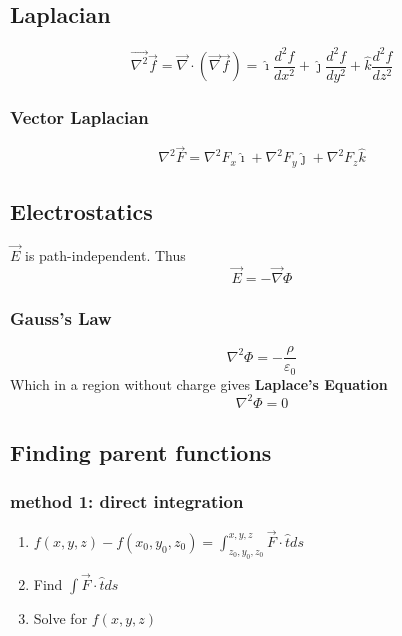 \subsection{Laplacian}
\begin{equation}
	\vec{\nabla^2}\vec{f}=\vec{\nabla}\cdot(\vec{\nabla}\vec{f})=\hat{\imath}\frac{d^2f}{dx^2}+\hat{\jmath}\frac{d^2f}{dy^2}+\hat{k}\frac{d^2f}{dz^2}
\end{equation}

\subsubsection{Vector Laplacian}
\begin{equation}
	\nabla^2\vec{F}=\nabla^2F_{x}\hat{\imath}+\nabla^2F_{y}\hat{\jmath}+\nabla^2F_z\hat{k}
\end{equation}

\subsection{Electrostatics}
$ \vec{E} $ is path-independent. Thus
\begin{equation}
	\vec{E}=-\vec{\nabla}\Phi
\end{equation}
\subsubsection{Gauss's Law}
\begin{equation}
	\nabla^2\Phi=-\frac{\rho}{\varepsilon_0}
\end{equation}
Which in a region without charge gives \textbf{Laplace's Equation}
\begin{equation}
	\nabla^2\Phi=0
\end{equation}

\subsection{Finding parent functions}
\subsubsection{method 1: direct integration}
\begin{enumerate}
	\item $ f(x,y,z)-f(x_0,y_0,z_0)=\int_{z_0,y_0,z_0}^{x,y,z}\vec{F} \cdot \hat{t}ds$
	\item Find $\int\vec{F}\cdot\hat{t}ds $
	\item Solve for $ f(x,y,z) $
\end{enumerate}
